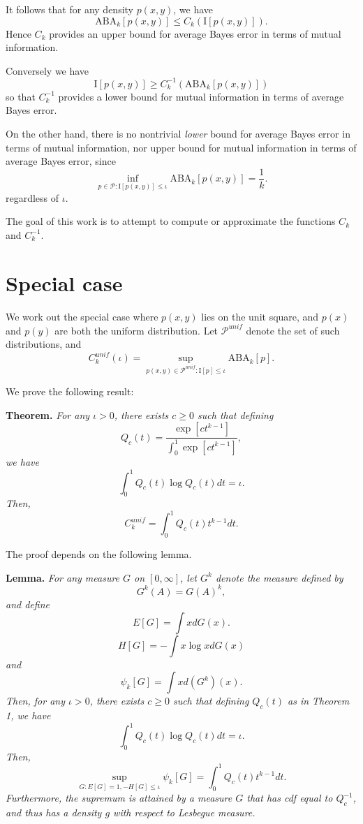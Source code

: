 \documentclass[12pt]{article}
\begin{document}
It follows that for any density $p(x,
y)$, we have
\[
\text{ABA}_k[p(x,y)] \leq C_k(\text{I}[p(x,y)]).
\]
Hence $C_k$ provides an upper bound for average Bayes error in terms of mutual information.

Conversely we have
\[
\text{I}[p(x,y)] \geq C^{-1}_k(\text{ABA}_k[p(x,y)])
\]
so that $C^{-1}_k$ provides a lower bound for mutual information in terms of average Bayes error.

On the other hand, there is no nontrivial \emph{lower} bound for average Bayes error in terms of mutual information,
nor upper bound for mutual information in terms of average Bayes error, since
\[
\inf_{p \in \mathcal{P}: \text{I}[p(x,y)] \leq \iota} \text{ABA}_k[p(x,y)] = \frac{1}{k}.
\]
regardless of $\iota$.

The goal of this work is to attempt to compute or approximate the functions $C_k$ and $C_k^{-1}$.

\section{Special case}

We work out the special case where $p(x,y)$ lies on the unit square, and $p(x)$ and $p(y)$ are both the uniform distribution.
Let $\mathcal{P}^{unif}$ denote the set of such distributions, and 
\[
C_k^{unif}(\iota) = \sup_{p(x, y) \in \mathcal{P}^{unif}: \text{I}[p] \leq \iota} \text{ABA}_k[p]. 
\]

We prove the following result:

\textbf{Theorem.} \emph{
For any $\iota > 0$, there exists $c \geq 0$ such that defining
\[
Q_c(t) = \frac{\exp[ct^{k-1}]}{\int_0^1 \exp[ct^{k-1}]},
\]
we have
\[
\int_0^1 Q_c(t) \log Q_c(t) dt = \iota.
\]
Then,
\[
C_k^{unif} = \int_0^1 Q_c(t) t^{k-1} dt.
\]
}

The proof depends on the following lemma.

\textbf{Lemma.} \emph{
For any measure $G$ on $[0, \infty]$,
let $G^k$ denote the measure defined by
\[
G^k(A) = G(A)^k,
\]
and define
\[
E[G] = \int x dG(x).
\]
\[
H[G] = -\int x \log x dG(x)
\]
and
\[
\psi_k[G] = \int x d(G^k)(x).
\]
Then, for any $\iota > 0$, there exists $c \geq 0$ such that defining
$Q_c(t)$ as in Theorem 1, we have
\[
\int_0^1 Q_c(t) \log Q_c(t) dt = \iota.
\]
Then,
\[
\sup_{G: E[G] = 1, -H[G] \leq \iota} \psi_k[G] = \int_0^1 Q_c(t) t^{k-1} dt.
\]
Furthermore, the supremum is attained by a measure $G$ that has cdf
equal to $Q_c^{-1}$, and thus has a density $g$ with respect to
Lesbegue measure.  }
\end{document}
